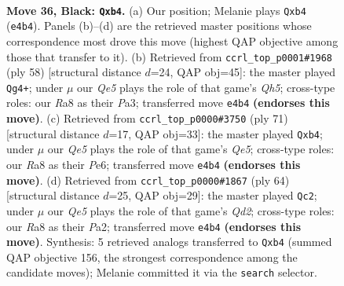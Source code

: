 \documentclass[11pt]{article}
\begin{document}
\clearpage

\begin{figure}[p]\centering
\begin{subfigure}{0.46\textwidth}\centering
\resizebox{\linewidth}{!}{%
\newchessgame
\chessboard[
  setfen={r7/6Qp/3pkp2/8/pP2q3/6P1/P4P1P/6K1 b - - 8 36},
  showmover=false,
  pgfstyle=straightmove, color=movearrow, markmove={e4-b4}
]}
\caption{}
\end{subfigure}\hfill
\begin{subfigure}{0.46\textwidth}\centering
\resizebox{\linewidth}{!}{%
\newchessgame
\chessboard[
  setfen={8/p3p1kp/2p2p2/P6Q/8/P4PP1/2P1K2P/6q1 w - - 0 30},
  showmover=false,
  pgfstyle=straightmove, color=movearrow, markmove={h5-g4}
]}
\caption{}
\end{subfigure}
\\[4pt]
\begin{subfigure}{0.46\textwidth}\centering
\resizebox{\linewidth}{!}{%
\newchessgame
\chessboard[
  setfen={8/Q4ppk/1p2p3/7p/1P2q3/6P1/P4P1P/6K1 b - - 8 36},
  showmover=false,
  pgfstyle=straightmove, color=movearrow, markmove={e4-b4}
]}
\caption{}
\end{subfigure}\hfill
\begin{subfigure}{0.46\textwidth}\centering
\resizebox{\linewidth}{!}{%
\newchessgame
\chessboard[
  setfen={8/p7/1p4kp/4qpp1/8/5PP1/PP1Q2KP/8 w - - 4 33},
  showmover=false,
  pgfstyle=straightmove, color=movearrow, markmove={d2-c2}
]}
\caption{}
\end{subfigure}
\caption{\textbf{Move 36, Black: \texttt{Qxb4}.} (a) Our position; Melanie plays \texttt{Qxb4} (\texttt{e4b4}). Panels (b)--(d) are the retrieved master positions whose correspondence most drove this move (highest QAP objective among those that transfer to it). (b) Retrieved from \texttt{ccrl\_top\_p0001\#1968} (ply 58) [structural distance $d$=24, QAP obj=45]: the master played \texttt{Qg4+}; under $\mu$ our \emph{Qe5} plays the role of that game's \emph{Qh5}; cross-type roles: our \emph{R}a8 as their \emph{P}a3; transferred move \texttt{e4b4} \textbf{(endorses this move)}. (c) Retrieved from \texttt{ccrl\_top\_p0000\#3750} (ply 71) [structural distance $d$=17, QAP obj=33]: the master played \texttt{Qxb4}; under $\mu$ our \emph{Qe5} plays the role of that game's \emph{Qe5}; cross-type roles: our \emph{R}a8 as their \emph{P}e6; transferred move \texttt{e4b4} \textbf{(endorses this move)}. (d) Retrieved from \texttt{ccrl\_top\_p0000\#1867} (ply 64) [structural distance $d$=25, QAP obj=29]: the master played \texttt{Qc2}; under $\mu$ our \emph{Qe5} plays the role of that game's \emph{Qd2}; cross-type roles: our \emph{R}a8 as their \emph{P}a2; transferred move \texttt{e4b4} \textbf{(endorses this move)}. Synthesis: 5 retrieved analogs transferred to \texttt{Qxb4} (summed QAP objective 156, the strongest correspondence among the candidate moves); Melanie committed it via the \texttt{search} selector.}
\label{fig:thought-m71}
\end{figure}
\end{document}

